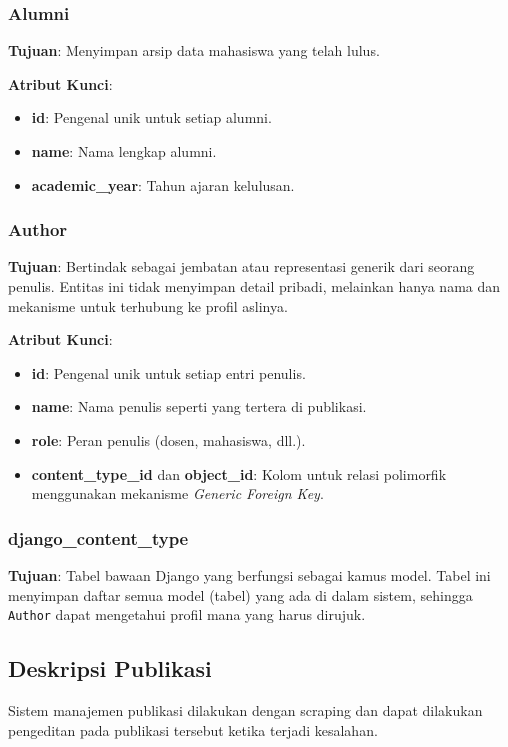 \subsubsection{Alumni}
\textbf{Tujuan}: Menyimpan arsip data mahasiswa yang telah lulus.

\textbf{Atribut Kunci}:
\begin{itemize}
    \item \textbf{id}: Pengenal unik untuk setiap alumni.
    \item \textbf{name}: Nama lengkap alumni.
    \item \textbf{academic\_year}: Tahun ajaran kelulusan.
\end{itemize}

\subsubsection{Author}
\textbf{Tujuan}: Bertindak sebagai jembatan atau representasi generik dari seorang penulis. 
Entitas ini tidak menyimpan detail pribadi, melainkan hanya nama dan mekanisme untuk terhubung 
ke profil aslinya.

\textbf{Atribut Kunci}:
\begin{itemize}
    \item \textbf{id}: Pengenal unik untuk setiap entri penulis.
    \item \textbf{name}: Nama penulis seperti yang tertera di publikasi.
    \item \textbf{role}: Peran penulis (dosen, mahasiswa, dll.).
    \item \textbf{content\_type\_id} dan \textbf{object\_id}: Kolom untuk relasi 
    polimorfik menggunakan mekanisme \textit{Generic Foreign Key}.
\end{itemize}

\subsubsection{django\_content\_type}
\textbf{Tujuan}: Tabel bawaan Django yang berfungsi sebagai kamus model. Tabel ini menyimpan daftar 
semua model (tabel) yang ada di dalam sistem, sehingga \texttt{Author} dapat mengetahui profil mana 
yang harus dirujuk.

\subsection{Deskripsi Publikasi}
Sistem manajemen publikasi dilakukan dengan scraping dan dapat dilakukan pengeditan pada publikasi tersebut ketika terjadi kesalahan.

